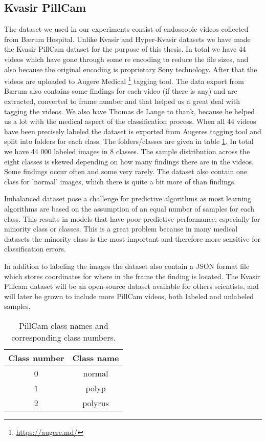 \documentclass[thesis.tex]{subfiles}
\begin{document}
\subsection{Kvasir PillCam} \label{sec:kvasir_pillcam}
The dataset we used in our experiments consist of endoscopic videos collected from Bærum Hospital. Unlike Kvasir and Hyper-Kvasir datasets we have made the Kvasir PillCam dataset for the purpose of this thesis. In total we have 44 videos which have gone through some re encoding to reduce the file sizes, and also because the original encoding is proprietary Sony technology. After that the videos are uploaded to Augere Medical \footnote{\url{https://augere.md/}} tagging tool. The data export from Bærum also contains some findings for each video (if there is any) and are extracted, converted to frame number and that helped us a great deal with tagging the videos. We also have Thomas de Lange to thank, because he helped us a lot with the medical aspect of the classification process. When all 44 videos have been precisely labeled the dataset is exported from Augeres tagging tool and split into folders for each class. The folders/classes are given in table \ref{table:kvasir_pillcam}. In total we have 44 000 labeled images in 8 classes. The sample distribution across the eight classes is skewed depending on how many findings there are in the videos. Some findings occur often and some very rarely. The dataset also contain one class for 'normal' images, which there is quite a bit more of than findings. 

Imbalanced dataset pose a challenge for predictive algorithms as most learning algorithms are based on the assumption of an equal number of samples for each class. This results in models that have poor predictive performance, especially for minority class or classes. This is a great problem because in many medical datasets the minority class is the most important and therefore more sensitive for classification errors.

In addition to labeling the images the dataset also contain a JSON format file which stores coordinates for where in the frame the finding is located. The Kvasir Pillcam dataset will be an open-source dataset available for others scientists, and will later be grown to include more PillCam videos, both labeled and unlabeled samples.

\begin{table}
  \centering
  \begin{tabular}{ |c|c| }
  	\hline
  	Class number & Class name \\
    \hline
    0 & normal \\ 
    1 & polyp \\ 
    2 & polyrus \\ 
    \hline
  \end{tabular}
  \caption{PillCam class names and corresponding class numbers.}
  \label{table:kvasir_pillcam}
\end{table}
\end{document}

